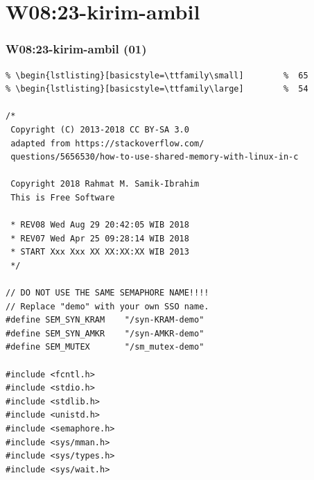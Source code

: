\documentclass[xcolor=table, notheorems, hyperref={pdfpagelabels=false}]{beamer}
\begin{document}
\section{W08:23-kirim-ambil}
\begin{frame}[fragile]
\frametitle{W08:23-kirim-ambil (01)}
\begin{lstlisting}[basicstyle=\ttfamily\tiny]         % 108
% \begin{lstlisting}[basicstyle=\ttfamily\footnotesize] %  72
% \begin{lstlisting}[basicstyle=\ttfamily\small]        %  65
% \begin{lstlisting}[basicstyle=\ttfamily\large]        %  54

/*
 Copyright (C) 2013-2018 CC BY-SA 3.0
 adapted from https://stackoverflow.com/
 questions/5656530/how-to-use-shared-memory-with-linux-in-c

 Copyright 2018 Rahmat M. Samik-Ibrahim
 This is Free Software

 * REV08 Wed Aug 29 20:42:05 WIB 2018
 * REV07 Wed Apr 25 09:28:14 WIB 2018
 * START Xxx Xxx XX XX:XX:XX WIB 2013
 */

// DO NOT USE THE SAME SEMAPHORE NAME!!!!
// Replace "demo" with your own SSO name.
#define SEM_SYN_KRAM    "/syn-KRAM-demo"
#define SEM_SYN_AMKR    "/syn-AMKR-demo"
#define SEM_MUTEX       "/sm_mutex-demo"

#include <fcntl.h>
#include <stdio.h>
#include <stdlib.h>
#include <unistd.h>
#include <semaphore.h>
#include <sys/mman.h>
#include <sys/types.h>
#include <sys/wait.h>

\end{lstlisting}
\end{frame}
\end{document}
